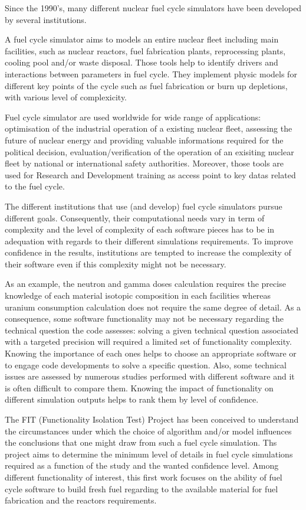 Since the 1990's, many different nuclear fuel cycle simulators have been
developed by several institutions.

A fuel cycle simulator aims to models an entire nuclear fleet including main
facilities, such as nuclear reactors, fuel fabrication plants, reprocessing
plants, cooling pool and/or waste disposal. Those tools help to identify drivers
and interactions between parameters in fuel cycle. They implement physic models
for different key points of the cycle such as fuel fabrication or burn up
depletions, with various level of complexicity. 

Fuel cycle simulator are used worldwide for wide range of applications:
optimisation of the industrial operation of a existing nuclear fleet, assessing
the future of nuclear energy and providing valuable informations required for
the political decision, evaluation/verification of the operation of an exisiting
nuclear fleet by national or international safety authorities. Moreover, those
tools are used for Research and Development training as access point to key
datas related to the fuel cycle. 

The different institutions that use (and develop) fuel cycle simulators pursue
different goals. Consequently, their computational needs vary in term of
complexity and the level of complexity of each software pieces has to be in
adequation with regards to their different simulations requirements. To improve
confidence in the results, institutions are tempted to increase the complexity
of their software even if this complexity might not be necessary.

As an example, the neutron and gamma doses calculation requires the precise
knowledge of each material isotopic composition in each facilities whereas
uranium consumption calculation does not require the same degree of detail. As a
consequence, some software functionality may not be necessary regarding the
technical question the code assesses: solving a given technical question
associated with a targeted precision will required a limited set of
functionality complexity. Knowing the importance of each ones helps to choose an
appropriate software or to engage code developments to solve a specific
question. Also, some technical issues are assessed by numerous studies performed
with different software and it is often difficult to compare them. Knowing the
impact of functionality on different simulation outputs helps to rank them by
level of confidence.

The FIT (Functionality Isolation Test) Project has been conceived to understand
the circumstances under which the choice of algorithm and/or model influences
the conclusions that one might draw from such a fuel cycle simulation. Ths
project aims to determine the minimum level of details in fuel cycle simulations
required as a function of the study and the wanted confidence level. Among
different functionality of interest, this first work focuses on the ability of
fuel cycle software to build fresh fuel regarding to the available material for
fuel fabrication and the reactors requirements.

